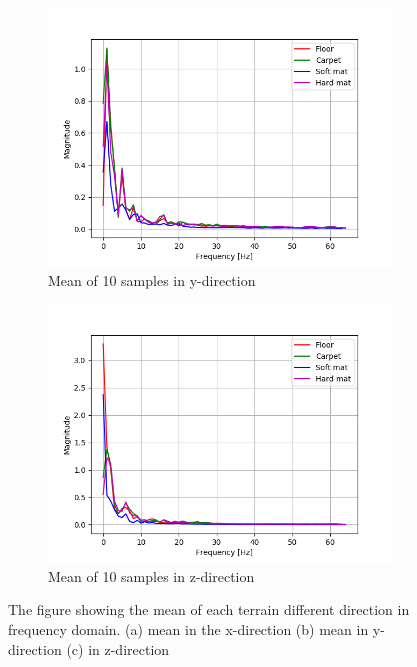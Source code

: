 \documentclass[USenglish]{ifimaster}  %
\begin{document}
	\begin{figure}[h] \ContinuedFloat	
		\begin{subfigure}[b]{0.95\textwidth}
			\includegraphics[width=1\linewidth]{Figures/ffty}
			\caption{Mean of 10 samples in y-direction}
			\label{fig:ffty}
		\end{subfigure}
		
		
		\begin{subfigure}[h]{0.95\textwidth}
			\includegraphics[width=1\linewidth]{Figures/fftz}
			\caption{Mean of 10 samples in z-direction}
			\label{fig:fftz}
		\end{subfigure}
		
		\caption[]{The figure showing the mean of each terrain different direction in frequency domain. (a) mean in the x-direction (b) mean in y-direction (c) in z-direction}
		\label{fig:fftxyz}
	\end{figure}
	\FloatBarrier
	
\end{document}
